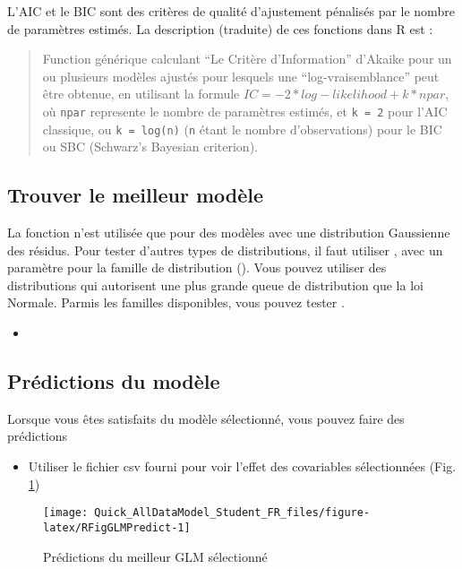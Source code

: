 \documentclass[french,a4paper]{article}
\providecommand{\tightlist}{%
  \setlength{\itemsep}{0pt}\setlength{\parskip}{0pt}}
\begin{document}
L'AIC et le BIC sont des critères de qualité d'ajustement pénalisés par
le nombre de paramètres estimés. La description (traduite) de ces
fonctions dans R est :

\begin{quote}
Function générique calculant ``Le Critère d'Information'' d'Akaike pour
un ou plusieurs modèles ajustés pour lesquels une ``log-vraisemblance''
peut être obtenue, en utilisant la formule
\(IC = -2*log-likelihood + k*npar\), où \texttt{npar} represente le
nombre de paramètres estimés, et \texttt{k\ =\ 2} pour l'AIC classique,
ou \texttt{k\ =\ log(n)} (\texttt{n} étant le nombre d'observations)
pour le BIC ou SBC (Schwarz's Bayesian criterion).
\end{quote}

\hypertarget{trouver-le-meilleur-modele}{%
\subsection{Trouver le meilleur
modèle}\label{trouver-le-meilleur-modele}}

La fonction  n'est utilisée que pour des modèles avec
une distribution Gaussienne des résidus. Pour tester d'autres types de
distributions, il faut utiliser , avec un paramètre
pour la famille de distribution (). Vous pouvez
utiliser des distributions qui autorisent une plus grande queue de
distribution que la loi Normale. Parmis les familles disponibles, vous
pouvez tester .

\begin{itemize}
\item
\end{itemize}

\hypertarget{predictions-du-modele}{%
\subsection{Prédictions du modèle}\label{predictions-du-modele}}

Lorsque vous êtes satisfaits du modèle sélectionné, vous pouvez faire
des prédictions

\begin{itemize}
\tightlist
\item
  Utiliser le fichier csv fourni pour voir l'effet des covariables
  sélectionnées (Fig. \ref{fig:RFigGLMPredict})
\end{itemize}



\begin{figure}[!h]

{\centering \texttt{[image: Quick\_AllDataModel\_Student\_FR\_files/figure-latex/RFigGLMPredict-1]} 

}

\caption{Prédictions du meilleur GLM sélectionné}\label{fig:RFigGLMPredict}
\end{figure}
\end{document}
